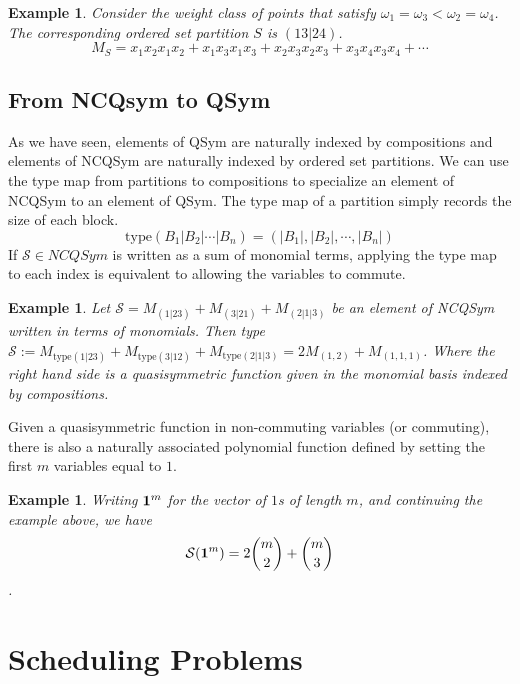 \documentclass[12pt]{amsart}
\newtheorem{example}[definition]{Example}
\begin{document}
\begin{example}

Consider the weight class of  points that satisfy $\omega_1 = \omega_3 < \omega_2 = \omega_4$.  The corresponding ordered set partition $S$ is $(13|24)$.  
$$M_S = x_1x_2x_1x_2 + x_1x_3x_1x_3 + x_2x_3x_2x_3 + x_3x_4x_3x_4 + \cdots$$  

\end{example}

\subsection{From NCQsym to QSym}

As we have seen, elements of QSym are naturally indexed by
compositions and elements of NCQSym are naturally indexed by ordered
set partitions.  We can use the type map from partitions to
compositions to specialize an element of NCQSym to an element of QSym.
The type map of a partition simply records the size of each block.
$$\textrm{type}(B_1|B_2|\cdots|B_n) = (|B_1|, |B_2|, \cdots, |B_n|)$$
If $\mathcal{S} \in NCQSym$ is written as a sum of monomial terms,
applying the type map to each index is equivalent to allowing the
variables to commute.

\begin{example}
Let $\mathcal{S} = M_{(1|23)} + M_{(3|21)} + M_{(2|1|3)}$ be an element of NCQSym written in terms of monomials.  Then 
{type} $\mathcal{S} :=  M_{\textrm{type} (1|23)} + M_{\textrm{type} (3|12)} + M_{\textrm{type} (2|1|3)} = 2 M_{(1,2)} + M_{(1,1,1)}$. Where the right hand side is a quasisymmetric function given in the monomial basis indexed by compositions.  
\end{example}



Given a quasisymmetric function in non-commuting variables (or
commuting), there is also a naturally associated polynomial function
defined by setting the first $m$ variables equal to $1$. 

\begin{example}
Writing ${\bf 1}^m$ for the vector of $1$s of length $m$, and continuing the example above, we have 
$$ \mathcal{S}({\bf 1}^m) = 2 {m \choose 2} + {m \choose 3}$$.  

\end{example}


\section{Scheduling Problems}
\end{document}

